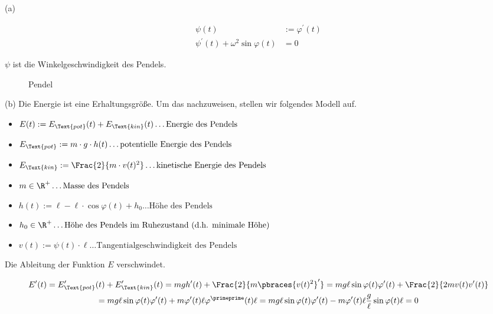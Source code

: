\begin{solution}

(a)

\begin{align*}
  \psi(t) & := \varphi^\prime(t) \\
  \psi^\prime(t) + \omega^2 \sin{\varphi(t)} & = 0
\end{align*}

$\psi$ ist die Winkelgeschwindigkeit des Pendels.

\begin{figure}[h!]
  \centering
  
  \caption{Pendel}
\end{figure}

(b) Die Energie ist eine Erhaltungsgröße. Um das nachzuweisen, stellen wir folgendes Modell auf.

\begin{itemize}
  \item
  $E(t) := E_\Text{pot}(t) + E_\Text{kin}(t)
  \ldots \text{Energie des Pendels}$
  \item
  $E_\Text{pot} := m \cdot g \cdot h(t)
  \ldots \text{potentielle Energie des Pendels}$
  \item
  $E_\Text{kin} := \Frac{2}{m \cdot v(t)^2}
  \ldots \text{kinetische Energie des Pendels}$
  \item
  $m \in \R^+
  \ldots \text{Masse des Pendels}$
  \item
  $h(t) := \ell - \ell \cdot \cos{\varphi(t)} + h_0
  \ldots \text{Höhe des Pendels}$
  \item
  $h_0 \in \R^+
  \ldots \text{Höhe des Pendels im Ruhezustand (d.h. minimale Höhe)}$
  \item
  $v(t) := \psi(t) \cdot \ell
  \ldots \text{Tangentialgeschwindigkeit des Pendels}$
\end{itemize}

Die Ableitung der Funktion $E$ verschwindet.

\begin{multline*}
  E^\prime(t)
  =
  E_\Text{pot}^\prime(t) + E_\Text{kin}^\prime(t)
  =
  m g h^\prime(t) + \Frac{2}{m \pbraces{v(t)^2}^\prime}
  =
  m g \ell \sin{\varphi(t) \varphi^\prime(t)} +
  \Frac{2}{2 m v(t) v^\prime(t)} \\
  =
  m g \ell \sin{\varphi(t) \varphi^\prime(t)} +
  m \varphi^\prime(t) \ell \varphi^\primeprime(t) \ell
  =
  m g \ell \sin{\varphi(t) \varphi^\prime(t)} -
  m \varphi^\prime(t) \ell \frac{g}{\ell} \sin{\varphi(t)} \ell = 0
\end{multline*}

\end{solution}
